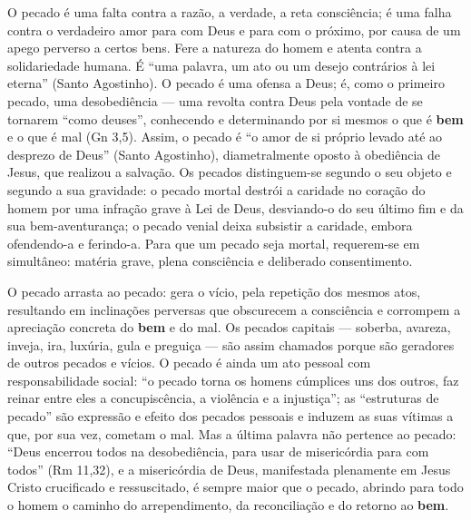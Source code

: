 O pecado é uma falta contra a razão, a verdade, a reta consciência; é uma falha contra o verdadeiro amor para com Deus e para com o próximo, por causa de um apego perverso a certos bens. Fere a natureza do homem e atenta contra a solidariedade humana. É ``uma palavra, um ato ou um desejo contrários à lei eterna'' (Santo Agostinho). O pecado é uma ofensa a Deus; é, como o primeiro pecado, uma desobediência --- uma revolta contra Deus pela vontade de se tornarem ``como deuses'', conhecendo e determinando por si mesmos o que é \textbf{bem} e o que é mal (Gn 3,5). Assim, o pecado é ``o amor de si próprio levado até ao desprezo de Deus'' (Santo Agostinho), diametralmente oposto à obediência de Jesus, que realizou a salvação. Os pecados distinguem-se segundo o seu objeto e segundo a sua gravidade: o pecado mortal destrói a caridade no coração do homem por uma infração grave à Lei de Deus, desviando-o do seu último fim e da sua bem-aventurança; o pecado venial deixa subsistir a caridade, embora ofendendo-a e ferindo-a. Para que um pecado seja mortal, requerem-se em simultâneo: matéria grave, plena consciência e deliberado consentimento.

O pecado arrasta ao pecado: gera o vício, pela repetição dos mesmos atos, resultando em inclinações perversas que obscurecem a consciência e corrompem a apreciação concreta do \textbf{bem} e do mal. Os pecados capitais --- soberba, avareza, inveja, ira, luxúria, gula e preguiça --- são assim chamados porque são geradores de outros pecados e vícios. O pecado é ainda um ato pessoal com responsabilidade social: ``o pecado torna os homens cúmplices uns dos outros, faz reinar entre eles a concupiscência, a violência e a injustiça''; as ``estruturas de pecado'' são expressão e efeito dos pecados pessoais e induzem as suas vítimas a que, por sua vez, cometam o mal. Mas a última palavra não pertence ao pecado: ``Deus encerrou todos na desobediência, para usar de misericórdia para com todos'' (Rm 11,32), e a misericórdia de Deus, manifestada plenamente em Jesus Cristo crucificado e ressuscitado, é sempre maior que o pecado, abrindo para todo o homem o caminho do arrependimento, da reconciliação e do retorno ao \textbf{bem}.
